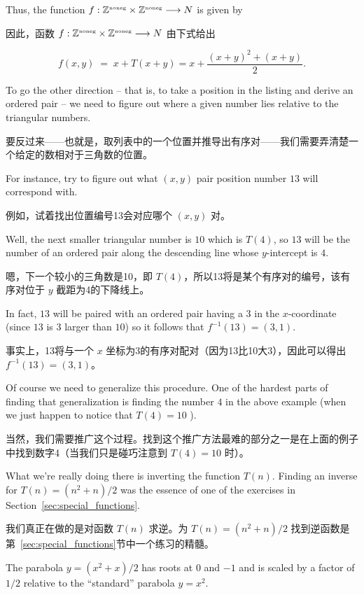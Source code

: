 Thus, the function
$f : {\mathbb Z}^{\mbox{\tiny noneg}} \times {\mathbb Z}^{\mbox{\tiny noneg}} \longrightarrow N$ is
given by

因此，函数 $f : {\mathbb Z}^{\mbox{\tiny noneg}} \times {\mathbb Z}^{\mbox{\tiny noneg}} \longrightarrow N$ 由下式给出

\[ f(x, y) \; = \;
    x + T(x + y) = x + \frac{(x + y)^2 + (x + y)}{2}.
\]

\noindent To go the other direction -- that is, to take a position
in the listing and
derive an ordered pair -- we need to figure out where a given number lies
relative to the triangular numbers.

\noindent 要反过来——也就是，取列表中的一个位置并推导出有序对——我们需要弄清楚一个给定的数相对于三角数的位置。

For instance, try to figure out what
$(x, y)$ pair position number $13$ will correspond with.

例如，试着找出位置编号13会对应哪个 $(x, y)$ 对。

Well, the next smaller
triangular number is $10$ which is $T(4)$, so $13$ will be the number of an
ordered pair along the descending line whose $y$-intercept is $4$.

嗯，下一个较小的三角数是10，即 $T(4)$，所以13将是某个有序对的编号，该有序对位于 $y$ 截距为4的下降线上。

In fact, $13$ will be paired
with an ordered pair having a $3$ in the $x$-coordinate (since $13$ is $3$
larger than $10$) so it follows that $f^{-1}(13) = (3, 1)$.

事实上，13将与一个 $x$ 坐标为3的有序对配对（因为13比10大3），因此可以得出 $f^{-1}(13) = (3, 1)$。

Of course we need to generalize this procedure.  One of the hardest parts
of finding that generalization is finding the number $4$ in the above example
(when we just happen to notice that $T(4)=10$ ).

当然，我们需要推广这个过程。找到这个推广方法最难的部分之一是在上面的例子中找到数字4（当我们只是碰巧注意到 $T(4)=10$ 时）。

What we're really doing
there is inverting the function $T(n)$.  Finding an inverse for
$T(n) = (n^2+n)/2$ was the essence of one of the exercises in
Section~\ref{sec:special_functions}.

我们真正在做的是对函数 $T(n)$ 求逆。为 $T(n) = (n^2+n)/2$ 找到逆函数是第~\ref{sec:special_functions}节中一个练习的精髓。

The parabola $y = (x^2 + x)/2$ has roots at $0$ and $-1$ and is scaled by a
factor of $1/2$ relative to the ``standard'' parabola $y = x^2$.

